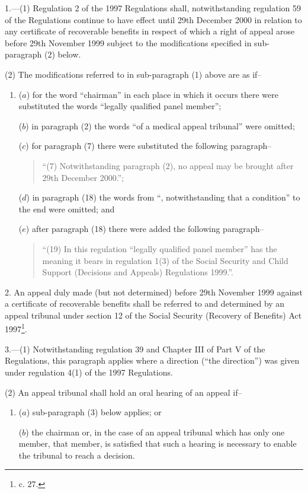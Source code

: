 \documentclass[12pt,a4paper]{article}
\begin{document}
\renewcommand\parthead{--- Schedule 21}

1.---(1)  Regulation 2 of the 1997 Regulations shall, notwithstanding regulation 59 of the Regulations continue to have effect until 29th December 2000 in relation to any certificate of recoverable benefits in respect of which a right of appeal arose before 29th November 1999 subject to the modifications specified in sub-paragraph (2) below.

(2) The modifications referred to in sub-paragraph (1) above are as if–
\begin{enumerate}\item[]
($a$) for the word “chairman” in each place in which it occurs there were substituted the words “legally qualified panel member”;

($b$) in paragraph (2) the words “of a medical appeal tribunal” were omitted;

($c$) for paragraph (7) there were substituted the following paragraph–
\begin{quotation}
“(7) Notwithstanding paragraph (2), no appeal may be brought after 29th December 2000.”;
\end{quotation}

($d$) in paragraph (18) the words from “, notwithstanding that a condition” to the end were omitted; and

($e$) after paragraph (18) there were added the following paragraph–
\begin{quotation}
“(19) In this regulation “legally qualified panel member” has the meaning it bears in regulation 1(3) of the Social Security and Child Support (Decisions and Appeals) Regulations 1999.”.
\end{quotation}
\end{enumerate}

\medskip

2.  An appeal duly made (but not determined) before 29th November 1999 against a certificate of recoverable benefits shall be referred to and determined by an appeal tribunal under section 12 of the Social Security (Recovery of Benefits) Act 1997\footnote{ c. 27.}.

\medskip

3.---(1)  Notwithstanding regulation 39 and Chapter III of Part V of the Regulations, this paragraph applies where a direction (“the direction”) was given under regulation 4(1) of the 1997 Regulations.

(2) An appeal tribunal shall hold an oral hearing of an appeal if–
\begin{enumerate}\item[]
($a$) sub-paragraph (3) below applies; or

($b$) the chairman or, in the case of an appeal tribunal which has only one member, that member, is satisfied that such a hearing is necessary to enable the tribunal to reach a decision.
\end{enumerate}
\end{document}
